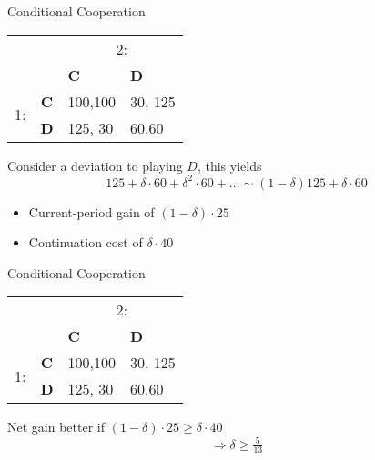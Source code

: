 \documentclass[english]{beamer}
\begin{document}
\begin{frame}{Conditional Cooperation}
\begin{card}
\begin{center}
    \begin{tabular}{cc|p{}|p{}|}
         & \multicolumn{1}{c}{} & \multicolumn{2}{c}{2:}\\
         & \multicolumn{1}{c}{} & \multicolumn{1}{p{0.14\textwidth}}{\textbf{C}} & \multicolumn{1}{p{0.14\textwidth}}{\textbf{D}}\\
        \cline{3-4}
        \multirow{2}{*}{1:} & \textbf{C} & 100,100 & 30, 125\\
        \cline{3-4}
         & \textbf{D} & 125, 30 & 60,60\\
        \cline{3-4}
    \end{tabular}
\end{center}
\end{card}
\begin{card}
Consider a deviation to playing $D$, this yields
    $$ 125+\delta\cdot60+\delta^{2}\cdot60+\ldots\sim(1-\delta)125+\delta\cdot60$$
   \begin{itemize}
    \item Current-period gain of $(1-\delta)\cdot25$
    \item Continuation cost of $\delta\cdot40$
    \end{itemize}
\end{card}
\end{frame}
\begin{frame}{Conditional Cooperation}
\begin{card}
\begin{center}
    \begin{tabular}{cc|p{}|p{}|}
         & \multicolumn{1}{c}{} & \multicolumn{2}{c}{2:}\\
         & \multicolumn{1}{c}{} & \multicolumn{1}{p{0.14\textwidth}}{\textbf{C}} & \multicolumn{1}{p{0.14\textwidth}}{\textbf{D}}\\
        \cline{3-4}
        \multirow{2}{*}{1:} & \textbf{C} & 100,100 & 30, 125\\
        \cline{3-4}
         & \textbf{D} & 125, 30 & 60,60\\
        \cline{3-4}
    \end{tabular}
\end{center}
\end{card}
\begin{card}
Net gain better if $(1-\delta)\cdot 25 \geq \delta\cdot40$
    $$ \Rightarrow \delta \geq \tfrac{5}{13}$$
\end{card}
\end{frame}
\end{document}
